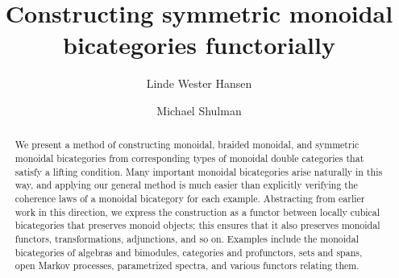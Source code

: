 \documentclass{amsart}
\title{Constructing symmetric monoidal bicategories functorially}
\author{Linde Wester Hansen}
\author{Michael Shulman}
\newcounter{mondbl}             %
\begin{document}
\begin{abstract}
  We present a method of constructing monoidal, braided monoidal, and symmetric monoidal bicategories from corresponding types of monoidal double categories that satisfy a lifting condition.
  Many important monoidal bicategories arise naturally in this way, and applying our general method is much easier than explicitly verifying the coherence laws of a monoidal bicategory for each example.
  Abstracting from earlier work in this direction, we express the construction as a functor between locally cubical bicategories that preserves monoid objects; this ensures that it also preserves monoidal functors, transformations, adjunctions, and so on.
  Examples include the monoidal bicategories of algebras and bimodules, categories and profunctors, sets and spans, open Markov processes, parametrized spectra, and various functors relating them.
\end{abstract}

\maketitle
\setcounter{tocdepth}{1}
\tableofcontents











%

%


 
\appendix




\end{document}
